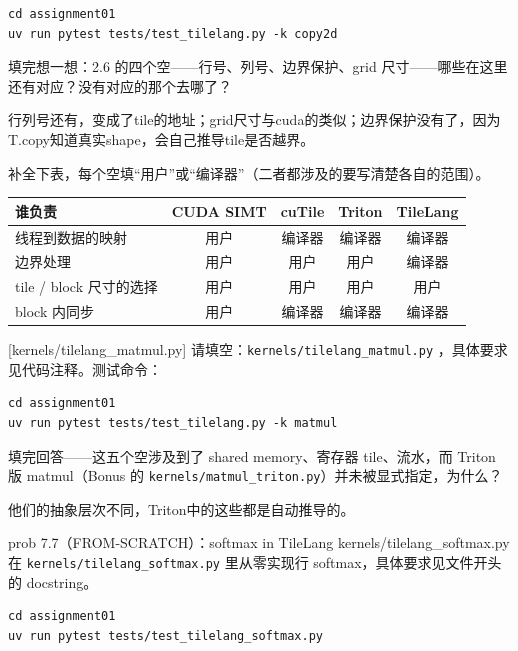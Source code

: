 \documentclass[11pt,a4paper,fontset=none]{ctexart}
\begin{document}
\begin{lstlisting}
cd assignment01
uv run pytest tests/test_tilelang.py -k copy2d
\end{lstlisting}

填完想一想：2.6 的四个空——行号、列号、边界保护、grid 尺寸——哪些在这里还有对应？没有对应的那个去哪了？

行列号还有，变成了tile的地址；grid尺寸与cuda的类似；边界保护没有了，因为T.copy知道真实shape，会自己推导tile是否越界。

补全下表，每个空填“用户”或“编译器”（二者都涉及的要写清楚各自的范围）。

\begin{center}\small
\begin{tabular}{@{}lcccc@{}}
\toprule
谁负责 & CUDA SIMT & cuTile & Triton & TileLang \\
\midrule
线程到数据的映射 & 用户 & 编译器 & 编译器 & 编译器 \\
边界处理 & 用户 & 用户 & 用户 & 编译器 \\
tile / block 尺寸的选择 & 用户 & 用户 & 用户 & 用户 \\
block 内同步 & 用户 & 编译器 & 编译器 & 编译器\\
\bottomrule
\end{tabular}
\end{center}

[kernels/tilelang\_matmul.py]
请填空：\texttt{kernels/tilelang\_matmul.py} ，具体要求见代码注释。测试命令：

\begin{lstlisting}
cd assignment01
uv run pytest tests/test_tilelang.py -k matmul
\end{lstlisting}

填完回答——这五个空涉及到了 shared memory、寄存器 tile、流水，而 Triton 版 matmul（Bonus 的 \texttt{kernels/matmul\_triton.py}）并未被显式指定，为什么？

他们的抽象层次不同，Triton中的这些都是自动推导的。

\begin{capstone}{prob 7.7（FROM-SCRATCH）：softmax in TileLang \hfill {\footnotesize\ttfamily kernels/tilelang\_softmax.py}}
在 \texttt{kernels/tilelang\_softmax.py} 里从零实现行 softmax，具体要求见文件开头的 docstring。
\end{capstone}

\begin{lstlisting}
cd assignment01
uv run pytest tests/test_tilelang_softmax.py
\end{lstlisting}
\end{document}
